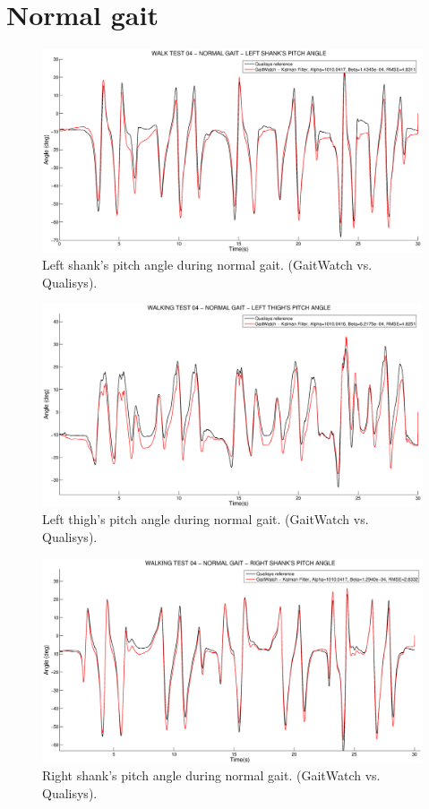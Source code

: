\section{Normal gait}

\begin{figure}[H]
\centering
\includegraphics[width=1\textwidth]{figures/Walking_04_left_shank.eps}
\caption{Left shank's pitch angle during normal gait. (GaitWatch vs. Qualisys).}
\label{fig:Walking_04_left_shank}
\end{figure}

\begin{figure}[H]
\centering
\includegraphics[width=1\textwidth]{figures/Walking_04_left_thigh.eps}
\caption{Left thigh's pitch angle during normal gait. (GaitWatch vs. Qualisys).}
\label{fig:Walking_04_left_thigh}
\end{figure}

\begin{figure}[H]
\centering
\includegraphics[width=1\textwidth]{figures/Walking_04_right_shank.eps}
\caption{Right shank's pitch angle during normal gait. (GaitWatch vs. Qualisys).}
\label{fig:Walking_04_right_shank}
\end{figure}

